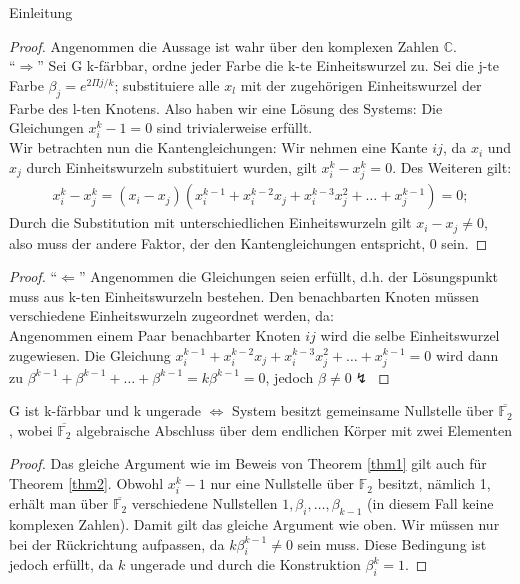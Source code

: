 \begin{mslide}{Einleitung}
\begin{proof}
Angenommen die Aussage ist wahr über den komplexen Zahlen $\mathbb{C}$. \\
 "`$\Rightarrow$"' Sei G k-färbbar, ordne jeder Farbe die k-te Einheitswurzel zu. Sei die j-te Farbe $\beta_j = e^{2\Pi j/k}$; substituiere alle $x_l$ mit der zugehörigen Einheitswurzel der Farbe des l-ten Knotens. Also haben wir eine Lösung des Systems: Die Gleichungen $x_i^k-1 = 0$ sind trivialerweise erfüllt. \\Wir betrachten nun die Kantengleichungen: Wir nehmen eine Kante $ij$, da $x_i$ und $x_j$ durch Einheitswurzeln substituiert wurden, gilt $x_i^k - x_j^k = 0$. Des Weiteren gilt: 
\begin{align*}
x_i^k-x_j^k = (x_i-x_j)(x_i^{k-1}+x_i^{k-2}x_j+x_i^{k-3}x_j^2+\ldots+x_j^{k-1}) = 0;
\end{align*}   
Durch die Substitution mit unterschiedlichen Einheitswurzeln gilt $x_i - x_j \neq 0$, also muss der andere Faktor, der den Kantengleichungen entspricht, 0 sein.
\end{proof}

\framebreak 

\begin{proof}
"`$\Leftarrow$"' Angenommen die Gleichungen seien erfüllt, d.h. der Lösungspunkt muss aus k-ten Einheitswurzeln bestehen. Den benachbarten Knoten müssen verschiedene Einheitswurzeln zugeordnet werden, da: \\
Angenommen einem Paar benachbarter Knoten $ij$ wird die selbe Einheitswurzel zugewiesen. Die Gleichung $x_i^{k-1}+x_i^{k-2}x_j+x_i^{k-3}x_j^2+\ldots+x_j^{k-1} = 0$ wird dann zu $\beta^{k-1}+\beta^{k-1}+\ldots+\beta^{k-1} = k\beta^{k-1} = 0$, jedoch $\beta \neq 0 \lightning$ 
\end{proof}

\framebreak

\begin{thm} \label{thm2}
G ist k-färbbar und k ungerade $\Leftrightarrow$ System besitzt gemeinsame Nullstelle über $\overline{\mathbb{F}_2}$, wobei  $\overline{\mathbb{F}_2}$ algebraische Abschluss über dem endlichen Körper mit zwei Elementen
\end{thm}

\begin{proof}
Das gleiche Argument wie im Beweis von Theorem \ref{thm1} gilt auch für Theorem \ref{thm2}. Obwohl $x_i^k - 1$ nur eine Nullstelle über $\mathbb{F}_2$ besitzt, nämlich 1, erhält man über $\overline{\mathbb{F}_2}$ verschiedene Nullstellen $1,\beta_i,\ldots,\beta_{k-1}$ (in diesem Fall keine komplexen Zahlen). Damit gilt das gleiche Argument wie oben. Wir müssen nur bei der Rückrichtung aufpassen, da $k\beta_i^{k-1} \neq 0$ sein muss. Diese Bedingung ist jedoch erfüllt, da $k$ ungerade und durch die Konstruktion $\beta_i^k = 1$. 
\end{proof}



\end{mslide}
